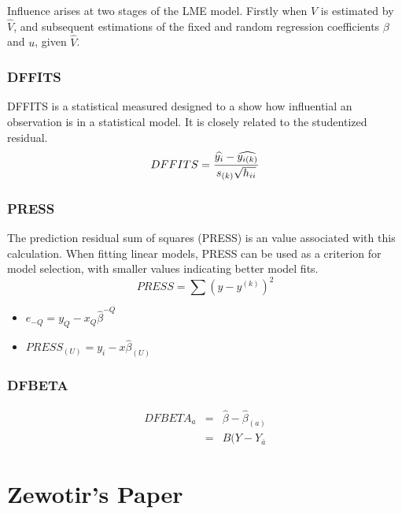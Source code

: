 \documentclass[12pt, a4paper]{report}
\theoremstyle{plain}
\theoremstyle{definition}
\theoremstyle{remark}
\begin{document}
Influence arises at two stages of the LME model. Firstly when $V$ is estimated by $\hat{V}$, and subsequent
estimations of the fixed and random regression coefficients $\beta$ and $u$, given $\hat{V}$.




\subsection{DFFITS} %
DFFITS is a statistical measured designed to a show how influential an observation is in a statistical model. It is closely related to the studentized residual.
\begin{displaymath} DFFITS = {\widehat{y_i} -
\widehat{y_{i(k)}} \over s_{(k)} \sqrt{h_{ii}}} \end{displaymath}




\subsection{PRESS} %
The prediction residual sum of squares (PRESS) is an value associated with this calculation. When fitting linear models, PRESS can be used as a criterion for model selection, with smaller values indicating better model fits.
\begin{equation}
PRESS = \sum(y-y^{(k)})^2
\end{equation}




\begin{itemize}
\item $e_{-Q} = y_{Q} - x_{Q}\hat{\beta}^{-Q}$
\item $PRESS_{(U)} = y_{i} - x\hat{\beta}_{(U)}$
\end{itemize}


\subsection{DFBETA} %
\begin{eqnarray}
DFBETA_{a} &=& \hat{\beta} - \hat{\beta}_{(a)} \\
&=& B(Y-Y_{\bar{a}}
\end{eqnarray}




\chapter{Zewotir's Paper}


\end{document}
